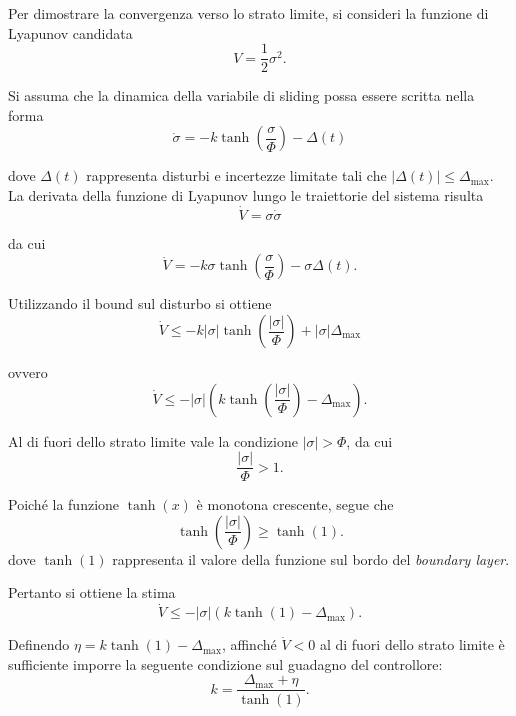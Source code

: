 Per dimostrare la convergenza verso lo strato limite, si consideri la funzione di Lyapunov candidata
\begin{equation}
V = \frac{1}{2}\sigma^2 .
\end{equation}

Si assuma che la dinamica della variabile di sliding possa essere scritta nella forma
\begin{equation}
\dot{\sigma} = -k \tanh\left(\frac{\sigma}{\Phi}\right) - \Delta(t)
\end{equation}

dove $\Delta(t)$ rappresenta disturbi e incertezze limitate tali che $|\Delta(t)| \le \Delta_{\max}$. La derivata della funzione di Lyapunov lungo le traiettorie del sistema risulta
\begin{equation}
\dot{V} = \sigma \dot{\sigma}
\end{equation}

da cui
\begin{equation}
\dot{V} = -k \sigma \tanh\left(\frac{\sigma}{\Phi}\right) - \sigma \Delta(t).
\end{equation}

Utilizzando il bound sul disturbo si ottiene
\begin{equation}
\dot{V} \le -k |\sigma| \tanh\left(\frac{|\sigma|}{\Phi}\right) + |\sigma| \Delta_{\max}
\end{equation}

ovvero
\begin{equation}
\dot{V} \le -|\sigma|\left(k \tanh\left(\frac{|\sigma|}{\Phi}\right) - \Delta_{\max}\right).
\end{equation}

Al di fuori dello strato limite vale la condizione $|\sigma|>\Phi$, da cui
\[
\frac{|\sigma|}{\Phi} > 1.
\]

Poiché la funzione $\tanh(x)$ è monotona crescente, segue che
\begin{equation}
\tanh\left(\frac{|\sigma|}{\Phi}\right) \ge \tanh(1).
\end{equation}
dove $\tanh(1)$ rappresenta il valore della funzione sul bordo del \textit{boundary layer}.

Pertanto si ottiene la stima
\begin{equation}
\dot{V} \le -|\sigma|\left(k\tanh(1)-\Delta_{\max}\right).
\end{equation}

Definendo $\eta = k \tanh(1) - \Delta_{\max}$, affinché $\dot{V}<0$ al di fuori dello strato limite è sufficiente imporre la seguente condizione sul guadagno del controllore:
\begin{equation}
k = \frac{\Delta_{\max} + \eta}{\tanh(1)}.
\end{equation}


